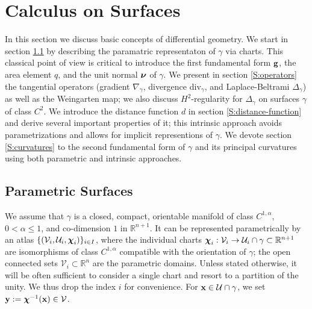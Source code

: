 
\section{Calculus on Surfaces}\label{sec:preliminaries}

In this section we discuss basic concepts of differential geometry.
We start in section \ref{S:repres-surface} by describing
the paramatric representaton of $\gamma$ via charts.
This classical point of view
is critical to introduce the first fundamental form ${\bf g}$, the area element $q$, and
the unit normal ${\boldsymbol \nu}$ of $\gamma$. We present in section \ref{S:operators} the
tangential operators (gradient $\nabla_\gamma$, divergence div$_\gamma$, and
Laplace-Beltrami $\Delta_\gamma$) as well as
the Weingarten map; we also discuss $H^2$-regularity for $\Delta_\gamma$
on surfaces $\gamma$ of class $C^2$.
We introduce the distance function $d$ in section
\ref{S:distance-function} and derive several important properties of it;
this intrinsic approach avoids
parametrizations and allows for implicit representions of $\gamma$. We devote section
\ref{S:curvatures} to
the second fundamental form of $\gamma$ and its principal curvatures using
both parametric and intrinsic approaches.

\subsection{Parametric Surfaces}\label{S:repres-surface}
%
We assume that $\gamma$ is a closed, compact, orientable manifold of class $C^{1,\alpha}$, $0<\alpha\leq1$, 
and co-dimension $1$ in $\mathbb{R}^{n+1}$. It can be represented parametrically
by an atlas $\lbrace ({\mathcal V}_i,{\mathcal U}_i,{\boldsymbol \chi}_i)\rbrace_{i\in I}$,
where the individual
charts ${\boldsymbol \chi}_i:{\mathcal V}_i \to {\mathcal U}_i\cap\gamma\subset\mathbb{R}^{n+1}$
are isomorphisms of class $C^{1,\alpha}$ compatible with the orientation of $\gamma$; the open connected sets
${\mathcal V}_i \subset \mathbb{R}^n$ are the parametric domains.
Unless stated otherwise, it will be often sufficient to consider a single chart and resort to a partition of the unity.
We thus drop the index $i$ for convenience.
For ${\bf x} \in {\mathcal U} \cap \gamma$, we set ${\bf y} := {\boldsymbol \chi}^{-1}({\bf x}) \in {\mathcal V}$.

